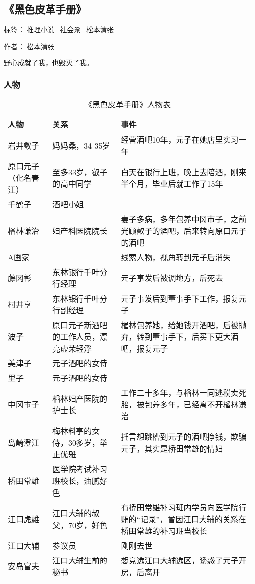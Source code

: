 \subsection{《黑色皮革手册》}

标签： 推理小说 \ 社会派 \  松本清张

作者：  松本清张

野心成就了我，也毁灭了我。

\subsubsection{人物}

\begin{table}[htp]
    \centering
    \caption{《黑色皮革手册》人物表}
    \begin{tabular}{p{} | p{} | p{}}
人物 & 关系 & 事件 \\
\hline
岩井叡子 & 妈妈桑，34-35岁 & 经营酒吧10年，元子在她店里实习一年 \\
原口元子（化名春江） & 至多33岁，叡子的高中同学 & 白天在银行上班，晚上去陪酒，刚来半个月，毕业后就工作了15年 \\
千鹤子 &  酒吧小姐 &   \\
楢林谦治  & 妇产科医院院长 &  妻子多病，多年包养中冈市子，之前光顾叡子的酒吧，后来转向原口元子的酒吧 \\
A画家 &    &   线索人物，视角转到元子后消失 \\
藤冈彰 & 东林银行千叶分行经理 & 元子事发后被调地方，后死去 \\
村井亨 & 东林银行千叶分行副经理 & 元子事发后到董事手下工作，报复元子 \\
波子 & 原口元子新酒吧的工作人员，漂亮虚荣轻浮 & 楢林包养她，给她钱开酒吧，后被抛弃，转到董事手下，后买下更大酒吧，报复元子 \\
美津子 & 元子酒吧的女侍 &  \\
里子 & 元子酒吧的女侍 &  \\
中冈市子 & 楢林妇产医院的护士长 & 工作二十多年，与楢林一同逃税卖死胎，被包养多年，已经离不开楢林谦治 \\
岛崎澄江 & 梅林料亭的女侍，30多岁，举止优雅 & 托言想跳槽到元子的酒吧挣钱，欺骗元子，其实是桥田常雄的情妇 \\
桥田常雄 & 医学院考试补习班校长，油腻好色 &   \\
江口虎雄 & 江口大辅的叔父，70岁，好色 & 有桥田常雄补习班内学员向医学院行贿的“记录”，曾因江口大辅的关系在桥田常雄的补习班当校长 \\
江口大辅 & 参议员 & 刚刚去世 \\
安岛富夫 & 江口大辅生前的秘书 & 想竞选江口大辅选区，诱惑了元子开房，后离开 \\

    \end{tabular}

\end{table}


